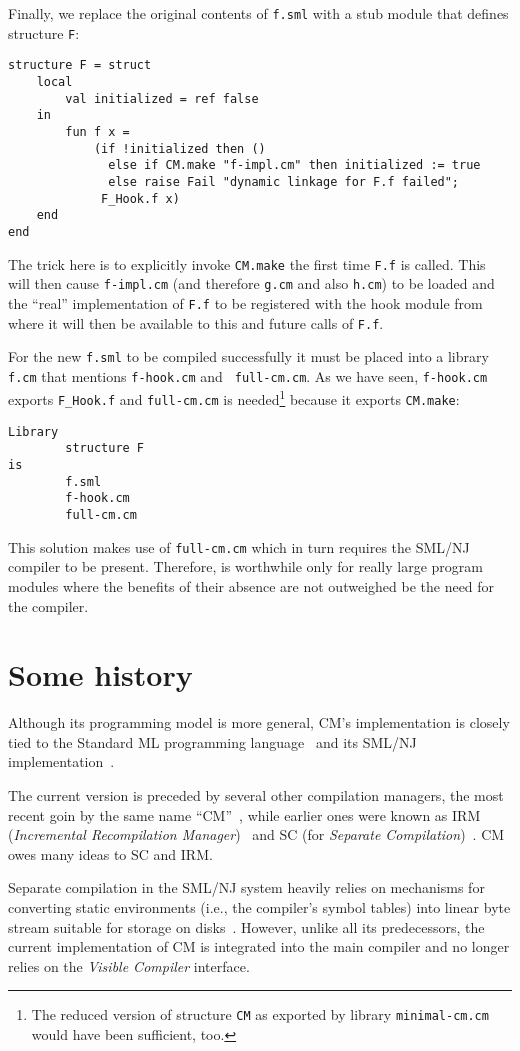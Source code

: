 \documentclass{article}
\begin{document}
Finally, we replace the original contents of {\tt f.sml} with a stub
module that defines structure {\tt F}:
\begin{verbatim}
structure F = struct
    local
        val initialized = ref false
    in
        fun f x =
            (if !initialized then ()
              else if CM.make "f-impl.cm" then initialized := true
              else raise Fail "dynamic linkage for F.f failed";
             F_Hook.f x)
    end
end
\end{verbatim}
\noindent The trick here is to explicitly invoke {\tt CM.make} the
first time {\tt F.f} is called.  This will then cause {\tt f-impl.cm}
(and therefore {\tt g.cm} and also {\tt h.cm}) to be loaded and the
``real'' implementation of {\tt F.f} to be registered with the hook
module from where it will then be available to this and future calls
of {\tt F.f}.

For the new {\tt f.sml} to be compiled successfully it must be placed
into a library {\tt f.cm} that mentions {\tt f-hook.cm} and {\tt
full-cm.cm}.  As we have seen, {\tt f-hook.cm} exports {\tt F\_Hook.f}
and {\tt full-cm.cm} is needed\footnote{The reduced version of
structure {\tt CM} as exported by library {\tt minimal-cm.cm} would
have been sufficient, too.}  because it exports {\tt CM.make}:
\begin{verbatim}
Library
        structure F
is
        f.sml
        f-hook.cm
        full-cm.cm
\end{verbatim}

  This solution makes use of {\tt full-cm.cm}
which in turn requires the SML/NJ compiler to be present.  Therefore,
is worthwhile only for really large program modules where the benefits
of their absence are not outweighed be the need for the compiler.

\section{Some history}

Although its programming model is more general, CM's implementation is
closely tied to the Standard ML programming language~\cite{milner97}
and its SML/NJ implementation~\cite{appel91:sml}.

The current version is preceded by several other compilation managers,
the most recent goin by the same name ``CM''~\cite{blume95:cm}, while
earlier ones were known as IRM ({\it Incremental Recompilation
Manager})~\cite{harper94:irm} and SC (for {\it Separate
Compilation})~\cite{harper-lee-pfenning-rollins-CM}.  CM owes many
ideas to SC and IRM.

Separate compilation in the SML/NJ system heavily relies on mechanisms
for converting static environments (i.e., the compiler's symbol
tables) into linear byte stream suitable for storage on
disks~\cite{appel94:sepcomp}.  However, unlike all its predecessors,
the current implementation of CM is integrated into the main compiler
and no longer relies on the {\em Visible Compiler} interface.

\cleardoublepage

\tableofcontents

\pagebreak


\end{document}
